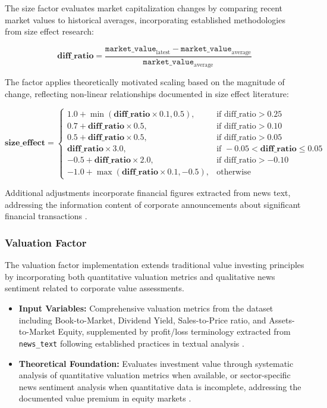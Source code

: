 \documentclass[3p,times,procedia]{elsarticle}
\begin{document}
The size factor evaluates market capitalization changes by comparing recent market values to historical averages, incorporating established methodologies from size effect research:

\begin{equation}
\textbf{diff\_ratio} = \frac{\texttt{market\_value}_{\text{latest}} - \texttt{market\_value}_{\text{average}}}{\texttt{market\_value}_{\text{average}}}
\end{equation}

The factor applies theoretically motivated scaling based on the magnitude of change, reflecting non-linear relationships documented in size effect literature:

\begin{equation}
\textbf{size\_effect} = 
\begin{cases} 
1.0 + \min(\textbf{diff\_ratio} \times 0.1, 0.5), & \text{if diff\_ratio} > 0.25 \\
0.7 + \textbf{diff\_ratio} \times 0.5, & \text{if diff\_ratio} > 0.10 \\
0.5 + \textbf{diff\_ratio} \times 0.5, & \text{if diff\_ratio} > 0.05 \\
\textbf{diff\_ratio} \times 3.0, & \text{if } -0.05 < \textbf{diff\_ratio} \leq 0.05 \\
-0.5 + \textbf{diff\_ratio} \times 2.0, & \text{if diff\_ratio} > -0.10 \\
-1.0 + \max(\textbf{diff\_ratio} \times 0.1, -0.5), & \text{otherwise}
\end{cases}
\end{equation}

Additional adjustments incorporate financial figures extracted from news text, addressing the information content of corporate announcements about significant financial transactions \cite{Daniel1998}.

\subsubsection{{Valuation Factor}}

The valuation factor implementation extends traditional value investing principles \cite{Rosenberg1985} by incorporating both quantitative valuation metrics and qualitative news sentiment related to corporate value assessments.

\begin{itemize}
    \item \textbf{Input Variables:} Comprehensive valuation metrics from the dataset \cite{FinReportDataset2025} including Book-to-Market, Dividend Yield, Sales-to-Price ratio, and Assets-to-Market Equity, supplemented by profit/loss terminology extracted from \texttt{news\_text} following established practices in textual analysis \cite{Loughran2011}.
    \item \textbf{Theoretical Foundation:} Evaluates investment value through systematic analysis of quantitative valuation metrics when available, or sector-specific news sentiment analysis when quantitative data is incomplete, addressing the documented value premium in equity markets \cite{FAMA1993}.
\end{itemize}
\end{document}
